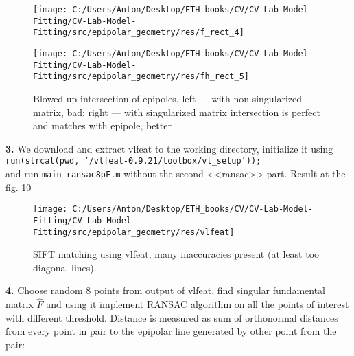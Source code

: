 \documentclass{report}
\begin{document}
\begin{figure}[h!]
	\begin{center}
		\begin{minipage}[h!]{0.49\linewidth}
			\texttt{[image: C:/Users/Anton/Desktop/ETH\_books/CV/CV-Lab-Model-Fitting/CV-Lab-Model-Fitting/src/epipolar\_geometry/res/f\_rect\_4]}
		\end{minipage}
		\hfill
		\begin{minipage}[h!]{0.49\linewidth}
			\texttt{[image: C:/Users/Anton/Desktop/ETH\_books/CV/CV-Lab-Model-Fitting/CV-Lab-Model-Fitting/src/epipolar\_geometry/res/fh\_rect\_5]}
		\end{minipage}
		
		\caption{Blowed-up intersection of epipoles, left --- with non-singularized matrix, bad; right --- with singularized matrix intersection is perfect and matches with epipole, better}
	\end{center}
\end{figure}
	\newpage
	\newpage
	\newpage
	\textbf{3.} We download and extract vlfeat to the working directory, initialize it using \\
	\texttt{run(strcat(pwd, '/vlfeat-0.9.21/toolbox/vl\_setup'));}\\
	and run \texttt{main\_ransac8pF.m} without the second <<ransac>> part. Result at the fig. 10
	\begin{figure}[h!]
		\begin{center}
			\begin{minipage}[h]{0.9\linewidth}
				\texttt{[image: C:/Users/Anton/Desktop/ETH\_books/CV/CV-Lab-Model-Fitting/CV-Lab-Model-Fitting/src/epipolar\_geometry/res/vlfeat]}
				\caption{SIFT matching using vlfeat, many inaccuracies present (at least too diagonal lines)}
			\end{minipage}
			\end{center}
	\end{figure}
	\newpage
	\textbf{4.} Choose random 8 points from output of vlfeat, find singular fundamental matrix $\hat{F}$ and using it implement RANSAC algorithm on all the points of interest with different threshold. Distance is measured as sum of orthonormal distances from every point in pair to the epipolar line generated by other point from the pair:%
\end{document}
